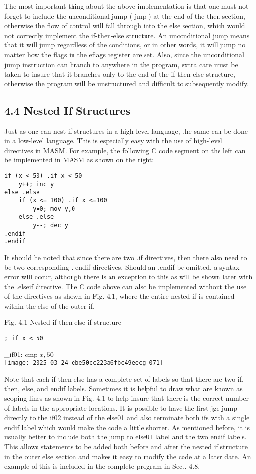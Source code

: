 \documentclass[10pt]{article}
\begin{document}
The most important thing about the above implementation is that one must not forget to include the unconditional jump ( jmp ) at the end of the then section, otherwise the flow of control will fall through into the else section, which would not correctly implement the if-then-else structure. An unconditional jump means that it will jump regardless of the conditions, or in other words, it will jump no matter how the flags in the eflags register are set. Also, since the unconditional jump instruction can branch to anywhere in the program, extra care must be taken to insure that it branches only to the end of the if-then-else structure, otherwise the program will be unstructured and difficult to subsequently modify.

\subsection*{4.4 Nested If Structures}
Just as one can nest if structures in a high-level language, the same can be done in a low-level language. This is especially easy with the use of high-level directives in MASM. For example, the following C code segment on the left can be implemented in MASM as shown on the right:

\begin{verbatim}
if (x < 50) .if x < 50
    y++; inc y
else .else
    if (x <= 100) .if x <=100
        y=0; mov y,0
    else .else
        y--; dec y
.endif
.endif
\end{verbatim}

It should be noted that since there are two .if directives, then there also need to be two corresponding . endif directives. Should an .endif be omitted, a syntax error will occur, although there is an exception to this as will be shown later with the .elseif directive. The C code above can also be implemented without the use of the directives as shown in Fig. 4.1, where the entire nested if is contained within the else of the outer if.

Fig. 4.1 Nested if-then-else-if structure

\begin{verbatim}
; if x < 50
\end{verbatim}

\_if01: cmp $x, 50$\\
\texttt{[image: 2025\_03\_24\_ebe50cc223a6fbc49eecg-071]}

Note that each if-then-else has a complete set of labels so that there are two if, then, else, and endif labels. Sometimes it is helpful to draw what are known as scoping lines as shown in Fig. 4.1 to help insure that there is the correct number of labels in the appropriate locations. It is possible to have the first jge jump directly to the if02 instead of the else01 and also terminate both ifs with a single endif label which would make the code a little shorter. As mentioned before, it is usually better to include both the jump to else01 label and the two endif labels. This allows statements to be added both before and after the nested if structure in the outer else section and makes it easy to modify the code at a later date. An example of this is included in the complete program in Sect. 4.8.
\end{document}
